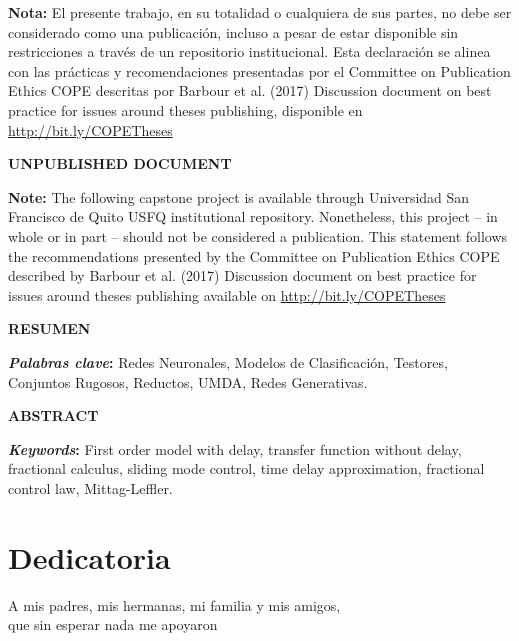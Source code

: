 \documentclass[a4paper, 12pt]{report}
\begin{document}
\noindent
\normalsize\textbf{Nota:} El presente trabajo, en su totalidad o cualquiera de sus partes, no debe ser considerado como una publicación, incluso a pesar de estar disponible sin restricciones a través de un repositorio institucional. Esta declaración se alinea con las prácticas y recomendaciones presentadas por el Committee on Publication Ethics COPE descritas por Barbour et al. (2017) Discussion document on best practice for issues around theses publishing, disponible en \url{http://bit.ly/COPETheses}

\setlength{\parskip}{10mm}
\begin{center}
\begin{LARGE}
\textbf{UNPUBLISHED DOCUMENT}
\end{LARGE}
\end{center}


\noindent
\normalsize\textbf{Note:} The following capstone project is available through Universidad San Francisco de Quito USFQ institutional repository. Nonetheless, this project – in whole or in part – should not be considered a publication. This statement follows the recommendations presented by the Committee on Publication Ethics COPE described by Barbour et al. (2017) Discussion document on best practice for issues around theses publishing available on \url{http://bit.ly/COPETheses}




\newpage
\begin{center}
  \large \textbf{RESUMEN}
\end{center}

\noindent
\textbf{\textit{Palabras clave}:} Redes Neuronales, Modelos de Clasificación,
Testores, Conjuntos Rugosos, Reductos, UMDA, Redes Generativas.
 

\newpage
\begin{center}
  \large \textbf{ABSTRACT}
\end{center}


\textbf{\textit{Keywords}:} First order model with delay, transfer function without delay, fractional calculus, sliding mode control, time delay approximation, fractional control law, Mittag-Leffler.

\newpage
\tableofcontents %

\newpage
\listoffigures %
\newpage
\section*{Dedicatoria}
\begin{flushright}
  \Large A mis padres, mis hermanas, mi familia y mis amigos, \\
  que sin esperar nada me apoyaron
\end{flushright}
\end{document}
